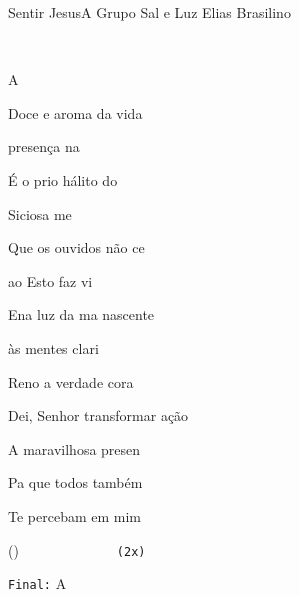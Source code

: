 \documentclass[a4,12pt,oneside]{book}
\newcommand{\RevDate}{\today}
\newcommand{\NotCCLIed}{\relax}
\begin{document}
\begin{song}{Sentir Jesus}{A}
  {Grupo Sal e Luz}
  {Elias Brasilino}
  {}
  {\NotCCLIed}
  
	\renewcommand{\RevDate}{12 de maio de 2014}

	
	\ifChordBk
		{\vspace{-2em}\flushright{\Achord \quad \Fsusmchord \quad \Fsusmschord \quad \Dchord \quad \Echord \quad \Eschord \quad \Bmchord
		
		~ \\
		
		\Csusmchord}\\}
		\vspace{-3cm}
	\fi
	
	\begin{SBVerse*}
		A 
		
		Doce e  aroma da vida 
		
		 presença na
		
		É o prio hálito do 
		
		Siciosa me
		
		Que os  ouvidos não ce
		
		 ao Esto faz vi 
		
		Ena luz da ma nascente
		
		 às mentes clari 
		
		Reno a verdade  cora 
	\end{SBVerse*}

	\begin{SBChorus*}
		Dei, Senhor transformar  ação

		A  maravilhosa presen \Ch{F#m7}{}

		Pa que todos também
		
		Te  percebam em mim  \Ch{A7}{}
	\end{SBChorus*}
	
	\begin{SBVerse*}
		() ~  ~  ~  ~  ~  ~  ~  ~ {\small\texttt{(2x)}}

		{\small\texttt{Final:}} {A \Ch{E}{Jesus}}
	\end{SBVerse*}
\end{song}
\end{document}
